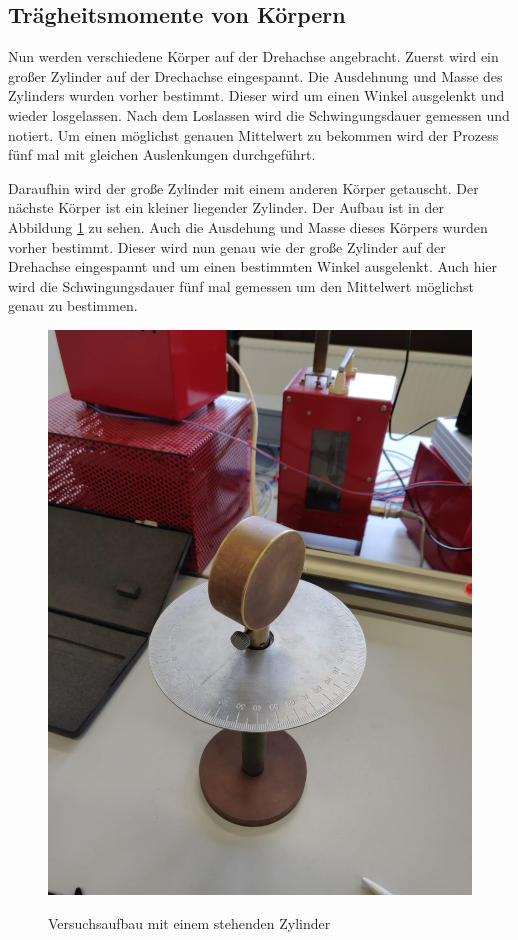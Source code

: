 \subsection{Trägheitsmomente von Körpern}
\FloatBarrier
Nun werden verschiedene Körper auf der Drehachse angebracht.
Zuerst wird ein großer Zylinder auf der Drechachse eingespannt.
Die Ausdehnung und Masse des Zylinders wurden vorher bestimmt.
Dieser wird um einen Winkel ausgelenkt und wieder losgelassen.
Nach dem Loslassen wird die Schwingungsdauer gemessen und notiert.
Um einen möglichst genauen Mittelwert zu bekommen wird der Prozess fünf mal mit gleichen Auslenkungen durchgeführt.

Daraufhin wird der große Zylinder mit einem anderen Körper getauscht.
Der nächste Körper ist ein kleiner liegender Zylinder.
Der Aufbau ist in der Abbildung \ref{fig:ZylinderStehend} zu sehen.
Auch die Ausdehung und Masse dieses Körpers wurden vorher bestimmt.
Dieser wird nun genau wie der große Zylinder auf der Drehachse eingespannt und um einen bestimmten Winkel ausgelenkt.
Auch hier wird die Schwingungsdauer fünf mal gemessen um den Mittelwert möglichst genau zu bestimmen.
\FloatBarrier

\begin{figure}
\centering
\caption{Versuchsaufbau mit einem stehenden Zylinder}
\includegraphics[scale=0.1]{content/data/ZylinderStehend.png}
\label{fig:ZylinderStehend}
\end{figure}

